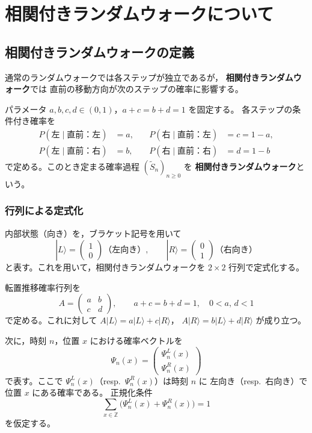 \documentclass[a4j,dvipdfmx]{jsarticle}
\theoremstyle{plainnote}
\begin{document}
\section{相関付きランダムウォークについて}

\subsection{相関付きランダムウォークの定義}

通常のランダムウォークでは各ステップが独立であるが，
\textbf{相関付きランダムウォーク}では
直前の移動方向が次のステップの確率に影響する。


パラメータ $a, b, c, d \in (0,1)$，$a + c = b + d = 1$ を固定する。
各ステップの条件付き確率を
\begin{align*}
  P(\text{左} \mid \text{直前：左}) &= a, \quad &
  P(\text{右} \mid \text{直前：左}) &= c = 1-a, \\
  P(\text{左} \mid \text{直前：右}) &= b, \quad &
  P(\text{右} \mid \text{直前：右}) &= d = 1-b
\end{align*}
で定める。このとき定まる確率過程 $(\tilde{S}_n)_{n \geq 0}$ を
\textbf{相関付きランダムウォーク}という。

\subsubsection*{行列による定式化}

内部状態（向き）を，ブラケット記号を用いて
\[
  |L\rangle = \begin{pmatrix}1\\0\end{pmatrix} \text{（左向き）}, \qquad
  |R\rangle = \begin{pmatrix}0\\1\end{pmatrix} \text{（右向き）}
\]
と表す。これを用いて，相関付きランダムウォークを $2 \times 2$ 行列で定式化する。

転置推移確率行列を
\[
  A = \begin{pmatrix} a & b \\ c & d \end{pmatrix}, \qquad
  a + c = b + d = 1, \quad 0 < a,\, d < 1
\]
で定める。これに対して
$A|L\rangle = a|L\rangle + c|R\rangle$，
$A|R\rangle = b|L\rangle + d|R\rangle$
が成り立つ。

次に，時刻 $n$，位置 $x$ における確率ベクトルを
\[
  \Psi_n(x) = \begin{pmatrix} \Psi_n^L(x) \\ \Psi_n^R(x) \end{pmatrix}
\]
で表す。ここで $\Psi_n^L(x)$（resp.\ $\Psi_n^R(x)$）は時刻 $n$ に
左向き（resp.\ 右向き）で位置 $x$ にある確率である。
正規化条件
\[
  \sum_{x \in \mathbb{Z}} \bigl(\Psi_n^L(x) + \Psi_n^R(x)\bigr) = 1
\]
を仮定する。
\end{document}
